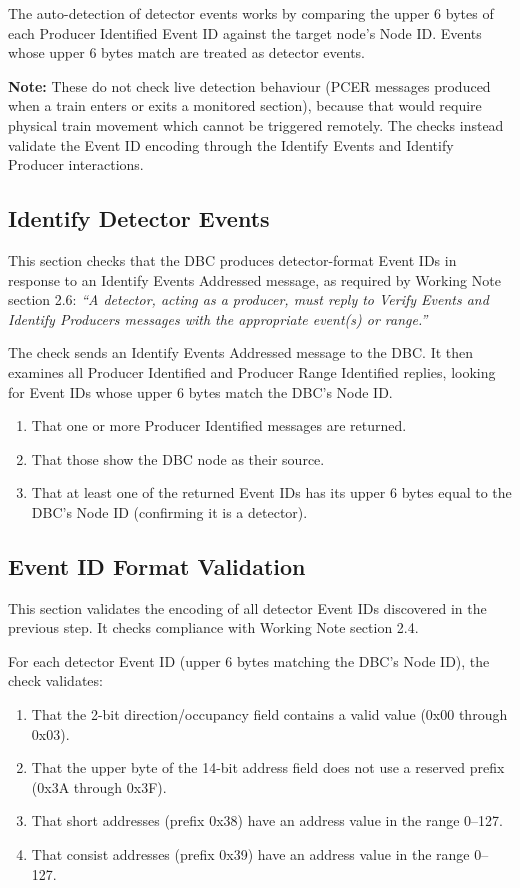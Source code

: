 The auto-detection of detector events works by comparing the upper 6 bytes
of each Producer Identified Event ID against the target node's Node ID.
Events whose upper 6 bytes match are treated as detector events.

\textbf{Note:}  These do not check live detection behaviour (PCER messages
produced when a train enters or exits a monitored section), because that
would require physical train movement which cannot be triggered remotely.
The checks instead validate the Event ID encoding through the Identify Events
and Identify Producer interactions.

\subsection{Identify Detector Events}

This section checks that the DBC produces detector-format Event IDs in
response to an Identify Events Addressed message, as required by
Working Note section 2.6:
\textit{``A detector, acting as a producer, must reply to Verify Events
and Identify Producers messages with the appropriate event(s) or range.''}

The check sends an Identify Events Addressed message to the DBC.
It then examines all Producer Identified and Producer Range Identified
replies, looking for Event IDs whose upper 6 bytes match the DBC's Node ID.

\begin{enumerate}
\item That one or more Producer Identified messages are returned.
\item That those show the DBC node as their source.
\item That at least one of the returned Event IDs has its upper 6 bytes
    equal to the DBC's Node ID (confirming it is a detector).
\end{enumerate}

\subsection{Event ID Format Validation}

This section validates the encoding of all detector Event IDs discovered
in the previous step.  It checks compliance with Working Note section 2.4.

For each detector Event ID (upper 6 bytes matching the DBC's Node ID),
the check validates:

\begin{enumerate}
\item That the 2-bit direction/occupancy field contains a valid value
    (0x00 through 0x03).
\item That the upper byte of the 14-bit address field does not use a
    reserved prefix (0x3A through 0x3F).
\item That short addresses (prefix 0x38) have an address value in the
    range 0--127.
\item That consist addresses (prefix 0x39) have an address value in the
    range 0--127.
\end{enumerate}

